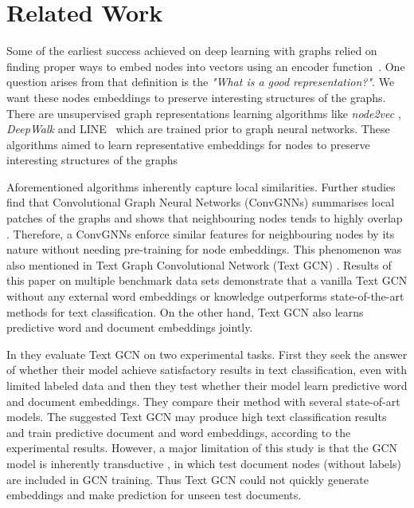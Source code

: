 \section{Related Work}\label{sec:related} 
Some of the earliest success achieved on deep learning with graphs relied on finding proper ways to embed nodes into vectors using an encoder function~\autocite{velickovic21gnn}. One question arises from that definition is the \emph{"What is a good representation?"}. We want these nodes embeddings to preserve interesting structures of the graphs. There are unsupervised graph representations learning algorithms like \emph{node2vec} \autocite{node2vec}, \emph{DeepWalk} \autocite{deepwalk2014} and LINE~\autocite{line2015} which are trained prior to graph neural networks. These algorithms aimed to learn representative embeddings for nodes to preserve interesting structures of the graphs 

Aforementioned algorithms inherently capture local similarities. Further studies find that Convolutional Graph Neural Networks (ConvGNNs) summarises local patches of the graphs and shows that neighbouring nodes tends to highly overlap \autocite{velickovic21gnn}. Therefore, a ConvGNNs enforce similar features for neighbouring nodes by its nature without needing pre-training for node embeddings. This phenomenon was also mentioned in Text Graph Convolutional Network (Text GCN) \autocite{yao18graph}. Results of this paper on multiple benchmark data sets demonstrate that a vanilla Text GCN without any external word embeddings or knowledge outperforms state-of-the-art methods for text classification. On the other hand, Text GCN also learns predictive word and document embeddings jointly. 

In \autocite{yao18graph} they evaluate Text GCN on two experimental tasks. First they seek the answer of whether their model achieve satisfactory results in text classification, even with limited labeled data and then they test whether their model learn predictive word and document embeddings. They compare their method with several state-of-art models. The suggested Text GCN may produce high text classification results and train predictive document and word embeddings, according to the experimental results. However, a major limitation of this study is that the GCN model is inherently transductive \autocite{yao18graph}, in which test document nodes (without labels) are included in GCN training. Thus Text GCN could not quickly generate embeddings and make prediction for unseen test documents.

